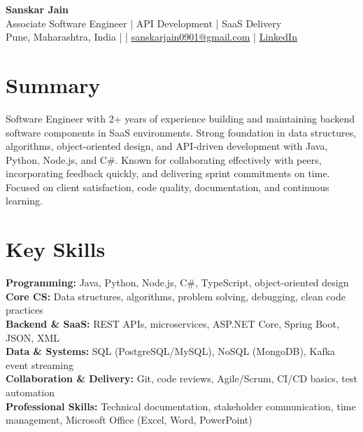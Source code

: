 \documentclass[10pt,letterpaper]{article}
\begin{document}
\begin{center}
    {\Large \textbf{Sanskar Jain}} \\
    Associate Software Engineer | API Development | SaaS Delivery \\
    Pune, Maharashtra, India \enspace |  \enspace | \enspace
    \href{mailto:sanskarjain0901@gmail.com}{sanskarjain0901@gmail.com} \enspace | \enspace
    \href{https://www.linkedin.com/in/sanskar-jain0901/}{LinkedIn}
\end{center}

\section*{Summary}
Software Engineer with 2+ years of experience building and maintaining backend software components in SaaS environments. Strong foundation in data structures, algorithms, object-oriented design, and API-driven development with Java, Python, Node.js, and C\#. Known for collaborating effectively with peers, incorporating feedback quickly, and delivering sprint commitments on time. Focused on client satisfaction, code quality, documentation, and continuous learning.

\section*{Key Skills}
\textbf{Programming:} Java, Python, Node.js, C\#, TypeScript, object-oriented design \\
\textbf{Core CS:} Data structures, algorithms, problem solving, debugging, clean code practices \\
\textbf{Backend \& SaaS:} REST APIs, microservices, ASP.NET Core, Spring Boot, JSON, XML \\
\textbf{Data \& Systems:} SQL (PostgreSQL/MySQL), NoSQL (MongoDB), Kafka event streaming \\
\textbf{Collaboration \& Delivery:} Git, code reviews, Agile/Scrum, CI/CD basics, test automation \\
\textbf{Professional Skills:} Technical documentation, stakeholder communication, time management, Microsoft Office (Excel, Word, PowerPoint)
\end{document}
